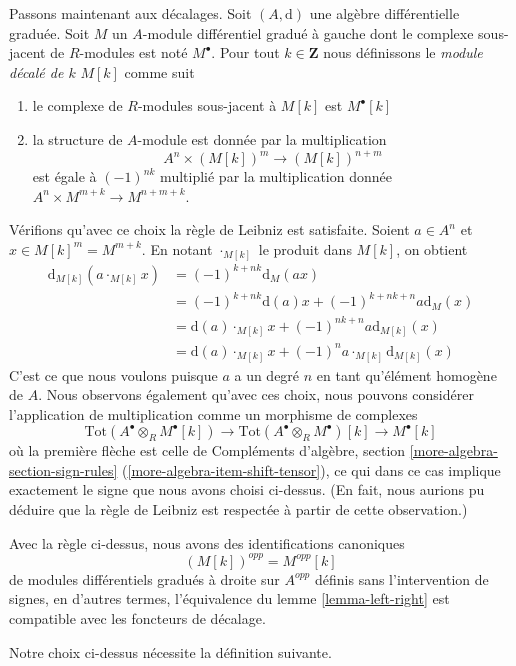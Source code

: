 \noindent
Passons maintenant aux décalages. Soit $(A, \text{d})$ une algèbre différentielle
graduée. Soit $M$ un $A$-module différentiel gradué à gauche dont le complexe
sous-jacent de $R$-modules est noté $M^\bullet$.
Pour tout $k \in \mathbf{Z}$ nous définissons le {\it module décalé de $k$}
$M[k]$ comme suit
\begin{enumerate}
\item le complexe de $R$-modules sous-jacent à $M[k]$ est $M^\bullet[k]$
\item la structure de $A$-module est donnée par la multiplication
$$
A^n \times (M[k])^m \longrightarrow (M[k])^{n + m}
$$
est égale à $(-1)^{nk}$ multiplié par la multiplication
donnée $A^n \times M^{m + k} \to M^{n + m + k}$.
\end{enumerate}
Vérifions qu'avec ce choix la règle de Leibniz est satisfaite.
Soient $a \in A^n$ et $x \in M[k]^m = M^{m + k}$. En notant
$\cdot_{M[k]}$ le produit dans $M[k]$, on obtient
\begin{align*}
\text{d}_{M[k]}(a \cdot_{M[k]} x)
& =
(-1)^{k + nk} \text{d}_M(ax) \\
& =
(-1)^{k + nk} \text{d}(a) x + (-1)^{k + nk + n} a \text{d}_M(x) \\ &
=
\text{d}(a) \cdot_{M[k]} x + (-1)^{nk + n} a \text{d}_{M[k]}(x) \\ & =
\text{d}(a)
\cdot_{M[k]} x + (-1)^n a \cdot_{M[k]} \text{d}_{M[k]}(x)
\end{align*}
C'est ce que nous voulons puisque $a$ a un degré $n$ en tant qu'élément homogène de $A$. Nous
observons également qu'avec ces choix, nous pouvons considérer
l'application de multiplication comme un morphisme de complexes
$$
\text{Tot}(A^\bullet \otimes_R M^\bullet[k]) \to
\text{Tot}(A^\bullet \otimes_R M^\bullet)[k] \to
M^\bullet[k]
$$
où la première flèche est
celle de Compléments d'algèbre, section \ref{more-algebra-section-sign-rules}
(\ref{more-algebra-item-shift-tensor}), ce qui dans ce cas implique
exactement le signe que nous avons choisi ci-dessus. (En fait, nous aurions pu déduire que la
règle de Leibniz est respectée à partir de cette observation.)

\medskip\noindent
Avec la règle ci-dessus, nous avons des identifications canoniques
$$
(M[k])^{opp} = M^{opp}[k]
$$
de modules différentiels gradués à droite sur
$A^{opp}$ définis sans l'intervention de signes, en d'autres termes, l'équivalence du
lemme \ref{lemma-left-right} est compatible avec les foncteurs de décalage.

\medskip\noindent
Notre choix ci-dessus nécessite la définition suivante.


